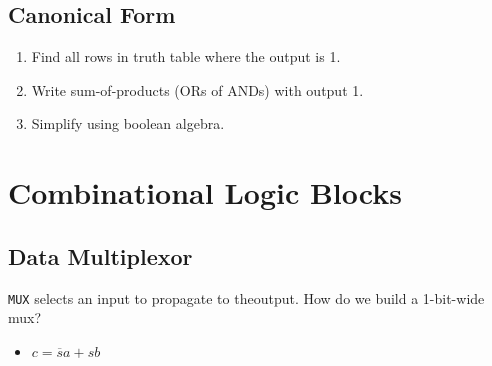 \subsection{Canonical Form}
\begin{enumerate}
    \item Find all rows in truth table where the output is 1.
    \item Write sum-of-products (ORs of ANDs) with output 1.
    \item Simplify using boolean algebra.
\end{enumerate}

\section{Combinational Logic Blocks}

\subsection{Data Multiplexor}
\texttt{MUX} selects an input to propagate to theoutput.
How do we build a 1-bit-wide mux?
\begin{itemize}
    \item $c = \overline{s}a + sb$
\end{itemize}